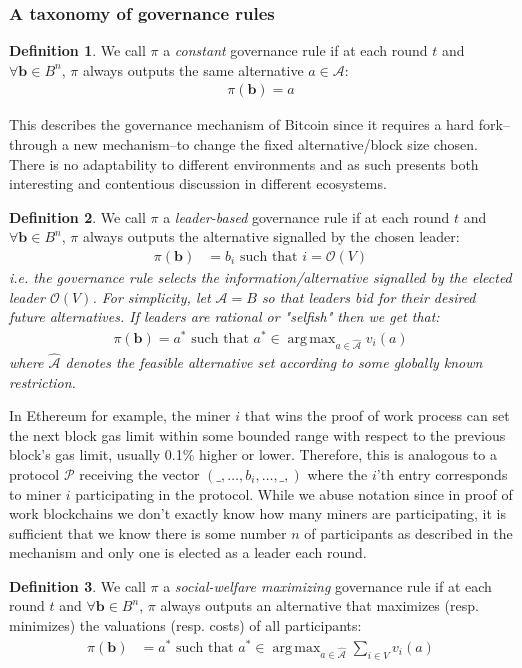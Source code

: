 \documentclass{article}
\DeclareMathOperator*{\argmax}{arg\,max}
\theoremstyle{definition}
\newtheorem{definition}{Definition}[section]
\theoremstyle{definition}
\newcounter{protocol}
\begin{document}
\subsubsection{A taxonomy of governance rules}
\begin{definition}
We call $\pi$ a \textit{constant} governance rule if at each round $t$ and $\forall \textbf{b}\in B^n$, $\pi$ always outputs the same alternative $a\in \mathcal{A}$:
\begin{align*}
    \pi(\textbf{b}) = a
\end{align*}
\end{definition}
This describes the governance mechanism of Bitcoin since it requires a hard fork--through a new mechanism--to change the fixed alternative/block size chosen. There is no adaptability to different environments and as such presents both interesting and contentious discussion in different ecosystems.
\begin{definition}
We call $\pi$ a \textit{leader-based} governance rule if at each round $t$ and $\forall \textbf{b}\in B^n$, $\pi$ always outputs the alternative signalled by the chosen leader:
\begin{align*}
    \pi(\textbf{b}) &= b_{i}\text{ such that }i = \mathcal{O}(V)
\end{align*}
\textit{i.e. the governance rule selects the information/alternative signalled by the elected leader $\mathcal{O}(V)$. For simplicity, let $\mathcal{A}=B$ so that leaders bid for their desired future alternatives. If leaders are rational or "selfish" then we get that:}
\begin{align*}
\pi(\textbf{b}) = a^*\text{ such that }a^* \in \argmax_{a\in \hat{\mathcal{A}}} v_i(a)
\end{align*}
\textit{where $\hat{\mathcal{A}}$ denotes the feasible alternative set according to some globally known restriction.}
\end{definition}
In Ethereum for example, the miner $i$ that wins the proof of work process can set the next block gas limit within some bounded range with respect to the previous block's gas limit, usually 0.1\% higher or lower. Therefore, this is analogous to a protocol $\mathcal{P}$ receiving the vector $(\_,\dots,b_i,\dots,\_,)$ where the $i$'th entry corresponds to miner $i$ participating in the protocol. While we abuse notation since in proof of work blockchains we don't exactly know how many miners are participating, it is sufficient that we know there is some number $n$ of participants as described in the mechanism and only one is elected as a leader each round.
\begin{definition}
We call $\pi$ a \textit{social-welfare maximizing} governance rule if at each round $t$ and $\forall \textbf{b}\in B^n$, $\pi$ always outputs an alternative that maximizes (resp. minimizes) the valuations (resp. costs) of all participants:
\begin{align*}
    \pi(\textbf{b}) &= a^*\text{ such that } a^*\in \argmax_{a\in \hat{\mathcal{A}}} \sum_{i\in V} v_i(a)
\end{align*}
\end{definition}
\end{document}
